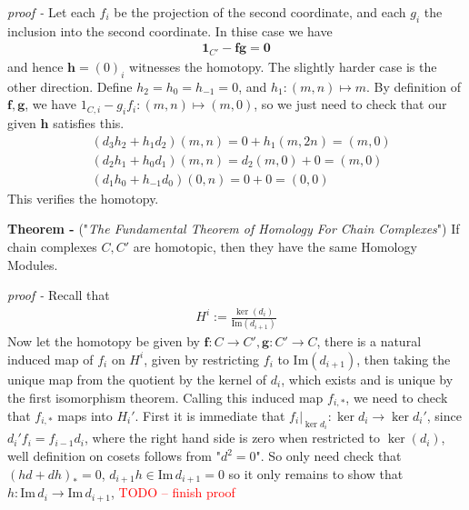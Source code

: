 \documentclass[11pt]{article}
\theoremstyle{definition}
\newcommand{\im}{\text{Im}}
\begin{document}
\emph{proof - } Let each \(f_i\) be the projection of the second coordinate, and each \(g_i\) the inclusion into the second coordinate. In thise case we have
\begin{align*}
    \mathbf{1}_{C'} - \mathbf{fg} = \mathbf{0}
\end{align*}
and hence \(\mathbf{h} = (0)_i\) witnesses the homotopy. The slightly harder case is the other direction. Define \(h_2 = h_0 = h_{-1} = 0\), and \(h_1: (m,n) \mapsto m\). By definition of \(\mathbf{f}, \mathbf{g}\), we have \(1_{C,i} - g_if_i: (m,n) \mapsto (m,0)\), so we just need to check that our given \(\mathbf{h}\) satisfies this.
\begin{align*}
    &(d_3h_2 + h_1d_2)(m,n) = 0 + h_1(m,2n) = (m,0) \\
    &(d_2h_1 + h_0d_1)(m,n) = d_2(m,0) + 0 = (m,0) \\
    &(d_1h_0 + h_{-1}d_0)(0,n) = 0 + 0 = (0,0)
\end{align*}
This verifies the homotopy.




\textbf{Theorem - }\label{CCEx4} ("\emph{The Fundamental Theorem of Homology For Chain Complexes}") If chain complexes \(C,C'\) are homotopic, then they have the same Homology Modules.

\emph{proof - } Recall that
\begin{align*}
    H^i := \frac{\ker(d_i)}{\im(d_{i+1})}
\end{align*}
Now let the homotopy be given by \(\mathbf{f}:C \to C', \mathbf{g}:C' \to C\), there is a natural induced map of \(f_i\) on \(H^i\), given by restricting \(f_i\) to \(\im(d_{i+1})\), then taking the unique map from the quotient by the kernel of \(d_i\), which exists and is unique by the first isomorphism theorem. Calling this induced map \(f_{i,*}\), we need to check that
\(f_{i,*}\) maps into \(H_i'\). First it is immediate that \(f_i\vert_{\ker{d_i}}: \ker d_i \to \ker d_i'\), since \(d_i'f_i = f_{i-1}d_i\), where the right hand side is zero when restricted to \(\ker(d_i)\), well definition on cosets follows from "\(d^2 = 0\)". So only need check that \((hd + dh)_* = 0\), \(d_{i+1}h \in \text{Im}\, d_{i+1} = 0\) so it only remains to show that \(h: \text{Im}\,d_i \to \text{Im}\,d_{i+1}\), \textcolor{red}{TODO -- finish proof}


\end{document}
